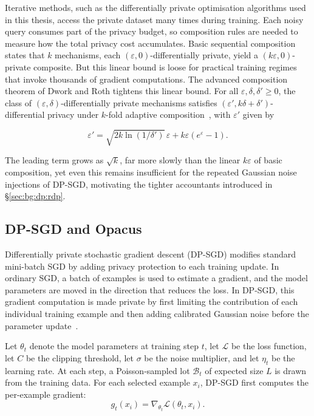 Iterative methods, such as the differentially private optimisation algorithms used in this
thesis, access the private dataset many times during training. Each noisy query consumes
part of the privacy budget, so composition rules are needed to measure how the total privacy
cost accumulates. Basic sequential composition states that $k$ mechanisms,
each $(\varepsilon, 0)$-differentially private, yield a
$(k\varepsilon, 0)$-private composite. But this linear bound is loose for
practical training regimes that invoke thousands of gradient computations.
The advanced composition theorem of Dwork and Roth tightens this linear
bound. For all $\varepsilon, \delta, \delta' \ge 0$, the class of
$(\varepsilon, \delta)$-differentially private mechanisms satisfies
$(\varepsilon', k\delta + \delta')$-differential privacy under $k$-fold
adaptive composition~\cite{Dwork2014Foundations}, with $\varepsilon'$ given by

\begin{equation}
\label{eq:bg:dp:advcomp}
\varepsilon' = \sqrt{2k \ln(1/\delta')}\,\varepsilon + k\varepsilon(e^{\varepsilon} - 1).
\end{equation}

The leading term grows as $\sqrt{k}$, far more slowly than the linear
$k\varepsilon$ of basic composition, yet even this remains insufficient for
the repeated Gaussian noise injections of DP-SGD, motivating the tighter
accountants introduced in §\ref{sec:bg:dp:rdp}.

\subsection{DP-SGD and Opacus}
\label{sec:bg:dp:dpsgd}

Differentially private stochastic gradient descent (DP-SGD) modifies standard
mini-batch SGD by adding privacy protection to each training update. In ordinary
SGD, a batch of examples is used to estimate a gradient, and the model
parameters are moved in the direction that reduces the loss. In DP-SGD, this
gradient computation is made private by first limiting the contribution of each
individual training example and then adding calibrated Gaussian noise
before the parameter update~\cite{Abadi2016DPSGD}.

Let $\theta_t$ denote the model parameters at training step $t$, let
$\mathcal{L}$ be the loss function, let $C$ be the clipping threshold, let
$\sigma$ be the noise multiplier, and let $\eta_t$ be the learning rate. At each
step, a Poisson-sampled lot $\mathcal{B}_t$ of expected size $L$ is drawn from
the training data. For each selected example $x_i$, DP-SGD first computes the
per-example gradient:
\begin{equation}
\label{eq:bg:dp:perexample}
g_t(x_i) = \nabla_{\theta_t} \mathcal{L}(\theta_t, x_i).
\end{equation}


